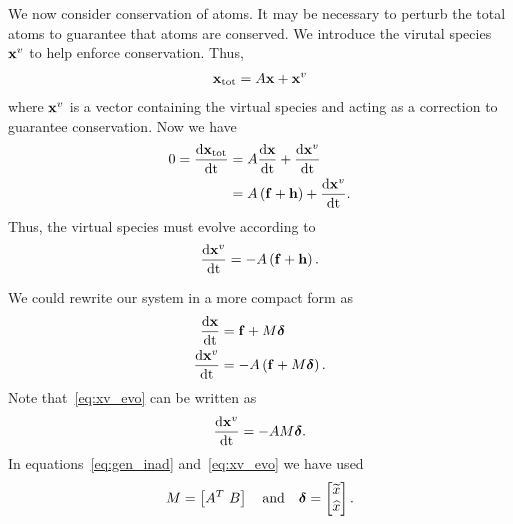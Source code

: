 We now consider conservation of atoms.  It may be necessary to perturb
the total atoms to guarantee that atoms are conserved.  We introduce 
the virutal species $\mathbf{x}^{v}$ to help enforce conservation.  Thus, 
\begin{align}
  \mathbf{x}_{\textrm{tot}} = A\mathbf{x} + \mathbf{x}^{v}
\end{align}
where $\mathbf{x}^{v}$ is a vector containing the virtual species and acting 
as a correction to guarantee conservation.  Now we have 
\begin{align}
  0 = \frac{\mathrm{d} \mathbf{x}_{\textrm{tot}}}{\mathrm{d} \mathrm{t}} &= A\frac{\mathrm{d} \mathbf{x}}{\mathrm{d} \mathrm{t}} + 
       \frac{\mathrm{d} \mathbf{x}^{v}}{\mathrm{d} \mathrm{t}} \\
    &= A\left(\mathbf{f} + \mathbf{h}\right) + \frac{\mathrm{d} \mathbf{x}^{v}}{\mathrm{d} \mathrm{t}}.
\end{align}
Thus, the virtual species must evolve according to 
\begin{align}
  \frac{\mathrm{d} \mathbf{x}^{v}}{\mathrm{d} \mathrm{t}} = -A\left(\mathbf{f} + \mathbf{h}\right).
\end{align}

We could rewrite our system in a more compact form as 
\begin{align}
  \frac{\mathrm{d} \mathbf{x}}{\mathrm{d} \mathrm{t}} &= \mathbf{f} + M\boldsymbol{\delta} \label{eq:gen_inad} \\
  \frac{\mathrm{d} \mathbf{x}^{v}}{\mathrm{d} \mathrm{t}} &= -A\left(\mathbf{f} + M\boldsymbol{\delta}\right) \label{eq:xv_evo}.
\end{align}
Note that~\eqref{eq:xv_evo} can be written as 
\begin{align}
  \frac{\mathrm{d} \mathbf{x}^{v}}{\mathrm{d} \mathrm{t}} = -AM\boldsymbol{\delta}.
\end{align}
In equations~\eqref{eq:gen_inad} and~\eqref{eq:xv_evo} we have used 
\begin{align}
  M = \left[A^{T} \ B\right] \quad \textrm{and} \quad 
  \boldsymbol{\delta} = \begin{bmatrix} \widetilde{x} \\ \widehat{x} \end{bmatrix}.
\end{align}

